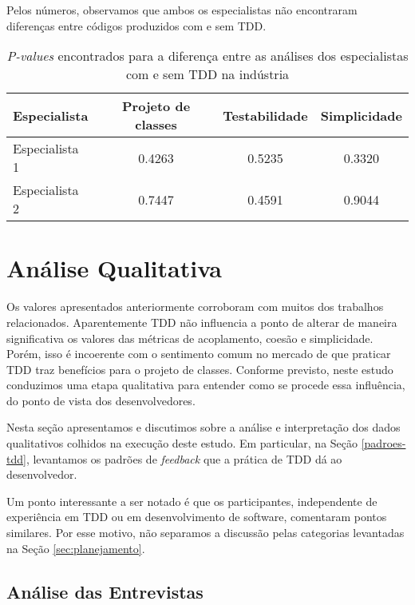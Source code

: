 \documentclass[conference]{IEEEtran}
\begin{document}
Pelos números, observamos que ambos os especialistas não encontraram diferenças 
entre códigos produzidos com e sem TDD. 

\begin{table}[h!]
	\centering
	\begin{tabular}{| p{2cm} | c | c | c | }
		\hline
		Especialista & Projeto de classes & Testabilidade & Simplicidade\\
		\hline
		Especialista 1 &	0.4263 &	0.5235 &	0.3320\\
		Especialista 2 &	0.7447 &	0.4591 &	0.9044\\
		\hline
	\end{tabular}
	\caption{\textit{P-values} encontrados para a diferença entre as análises dos especialistas com e sem TDD na indústria}
	\label{tab:especialistas-industria}
\end{table}

\section{Análise Qualitativa}

Os valores apresentados anteriormente corroboram com muitos dos trabalhos relacionados. 
Aparentemente TDD não influencia a ponto de alterar 
de maneira significativa os valores das métricas de acoplamento, coesão e simplicidade.
Porém, isso é incoerente com o sentimento comum no mercado de que praticar TDD
traz benefícios para o projeto de classes. Conforme previsto, neste estudo conduzimos
uma etapa qualitativa para entender como se procede essa influência, do ponto
de vista dos desenvolvedores.

Nesta seção apresentamos e discutimos sobre a análise e interpretação dos dados qualitativos colhidos
na execução deste estudo. Em particular, na Seção 
\ref{padroes-tdd}, levantamos os padrões de \textit{feedback} que a prática de TDD
dá ao desenvolvedor.

Um ponto interessante a ser notado é que os participantes, independente de experiência
em TDD ou em desenvolvimento de software, comentaram pontos similares. Por esse motivo,
não separamos a discussão pelas categorias levantadas na Seção \ref{sec:planejamento}.

\subsection{Análise das Entrevistas}
\end{document}
